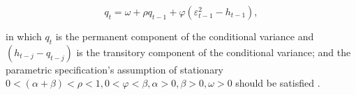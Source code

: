 \begin{equation}
q_{t} = \omega + \rho q_{t-1} +\varphi(\varepsilon_{t-1}^{2}-h_{t-1}),
\end{equation}

in which $q_{t}$ is the permanent component of the conditional variance and $(h_{t-j} - q_{t-j})$ is the transitory component of the conditional variance; and the parametric specification's assumption of stationary $0<(\alpha + \beta) < \rho <1, 0<\varphi<\beta, \alpha >0, \beta>0, \omega >0 $ should be satisfied \citep{0-19-829683-5,Ghalanos2014}.


%
%
% 
%
